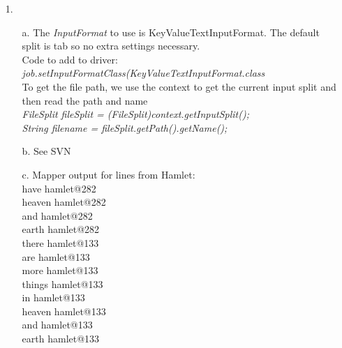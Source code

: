 \documentclass{article}
\begin{document}
\begin{itemize}
\item[1.] 
	\begin{itemize}
		\item[a.] The \textit{InputFormat} to use is KeyValueTextInputFormat. The default split is tab so no extra settings necessary.\\
			Code to add to driver: \textit{job.setInputFormatClass(KeyValueTextInputFormat.class}\\
			To get the file path, we use the context to get the current input split and then read the path and name\\
			\textit{FileSplit fileSplit = (FileSplit)context.getInputSplit();}\\
			\textit{String filename = fileSplit.getPath().getName();}\\
		\item[b.] See SVN
		\item[c.] Mapper output for lines from Hamlet:\\
			have	hamlet@282\\
			heaven	hamlet@282\\
			and	hamlet@282\\
			earth	hamlet@282\\
			there	hamlet@133\\
			are	hamlet@133\\
			more	hamlet@133\\
			things	hamlet@133\\
			in	hamlet@133\\
			heaven	hamlet@133\\
			and	hamlet@133\\
			earth	hamlet@133\\
	\end{itemize}


\end{itemize}
\end{document}
